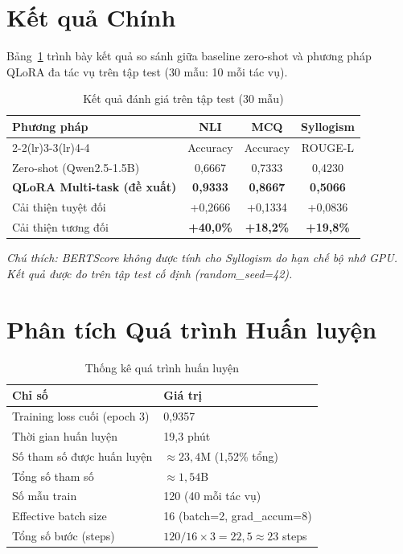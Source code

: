 \documentclass[fontsize=13pt,a4paper,oneside,DIV=calc,chapterprefix=true]{scrbook}
\begin{document}
\section{Kết quả Chính}

Bảng~\ref{tab:main_results} trình bày kết quả so sánh giữa baseline zero-shot và phương pháp
QLoRA đa tác vụ trên tập test (30 mẫu: 10 mỗi tác vụ).

\begin{table}[H]
\centering
\caption{Kết quả đánh giá trên tập test (30 mẫu)}
\label{tab:main_results}
\begin{tabular}{lccc}
\toprule
\multirow{2}{*}{\textbf{Phương pháp}} & \textbf{NLI} & \textbf{MCQ} & \textbf{Syllogism} \\
\cmidrule(lr){2-2}\cmidrule(lr){3-3}\cmidrule(lr){4-4}
 & Accuracy & Accuracy & ROUGE-L \\
\midrule
Zero-shot (Qwen2.5-1.5B) & 0,6667 & 0,7333 & 0,4230 \\
\textbf{QLoRA Multi-task (đề xuất)} & \textbf{0,9333} & \textbf{0,8667} & \textbf{0,5066} \\
\midrule
Cải thiện tuyệt đối & +0,2666 & +0,1334 & +0,0836 \\
Cải thiện tương đối & \textbf{+40,0\%} & \textbf{+18,2\%} & \textbf{+19,8\%} \\
\bottomrule
\end{tabular}
\end{table}

\textit{Chú thích: BERTScore không được tính cho Syllogism do hạn chế bộ nhớ GPU. Kết quả
được đo trên tập test cố định (random\_seed=42).}

\section{Phân tích Quá trình Huấn luyện}

\begin{table}[H]
\centering
\caption{Thống kê quá trình huấn luyện}
\label{tab:training_stats}
\begin{tabular}{ll}
\toprule
\textbf{Chỉ số} & \textbf{Giá trị} \\
\midrule
Training loss cuối (epoch 3) & 0,9357 \\
Thời gian huấn luyện & 19,3 phút \\
Số tham số được huấn luyện & $\approx 23{,}4$M (1,52\% tổng) \\
Tổng số tham số & $\approx 1{,}54$B \\
Số mẫu train & 120 (40 mỗi tác vụ) \\
Effective batch size & 16 (batch=2, grad\_accum=8) \\
Tổng số bước (steps) & $120 / 16 \times 3 = 22{,}5 \approx 23$ steps \\
\bottomrule
\end{tabular}
\end{table}
\end{document}
